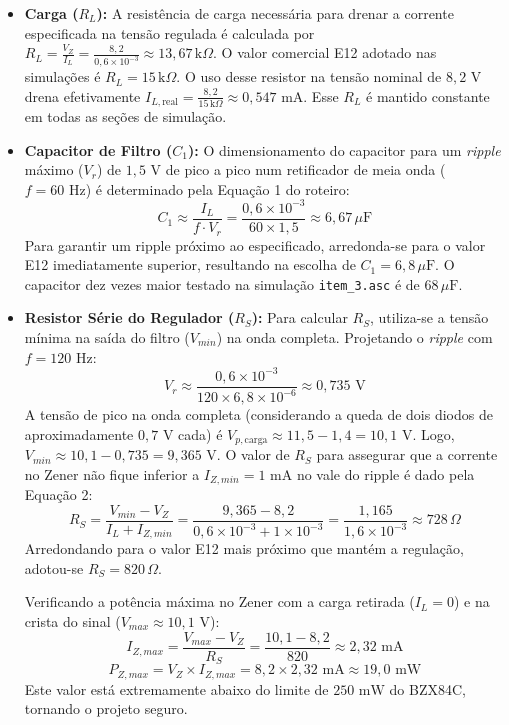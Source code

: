 \documentclass[11pt,a4paper]{article}
\begin{document}
\begin{itemize}

    \item \textbf{Carga ($R_L$):} 
    A resistência de carga necessária para drenar a corrente especificada na tensão regulada é calculada por $R_L = \frac{V_Z}{I_L} = \frac{8{,}2}{0{,}6 \times 10^{-3}} \approx 13{,}67\,\mathrm{k}\Omega$. O valor comercial E12 adotado nas simulações é $R_L = 15\,\mathrm{k}\Omega$. O uso desse resistor na tensão nominal de $8{,}2\text{ V}$ drena efetivamente $I_{L,\text{real}} = \frac{8{,}2}{15\,\mathrm{k}\Omega} \approx 0{,}547\text{ mA}$. Esse $R_L$ é mantido constante em todas as seções de simulação.

    \item \textbf{Capacitor de Filtro ($C_1$):}
    O dimensionamento do capacitor para um \textit{ripple} máximo ($V_r$) de $1{,}5\text{ V}$ de pico a pico num retificador de meia onda ($f = 60\text{ Hz}$) é determinado pela Equação 1 do roteiro:
    \[
    C_1 \approx \frac{I_L}{f \cdot V_r} = \frac{0{,}6 \times 10^{-3}}{60 \times 1{,}5} \approx 6{,}67\,\mu\text{F}
    \]
    Para garantir um ripple próximo ao especificado, arredonda-se para o valor E12 imediatamente superior, resultando na escolha de $C_1 = 6{,}8\,\mu\text{F}$. O capacitor dez vezes maior testado na simulação \texttt{item\_3.asc} é de $68\,\mu\text{F}$.

    \item \textbf{Resistor Série do Regulador ($R_S$):}
    Para calcular $R_S$, utiliza-se a tensão mínima na saída do filtro ($V_{min}$) na onda completa. Projetando o \textit{ripple} com $f = 120\text{ Hz}$:
    \[
    V_r \approx \frac{0{,}6 \times 10^{-3}}{120 \times 6{,}8 \times 10^{-6}} \approx 0{,}735\text{ V}
    \]
    A tensão de pico na onda completa (considerando a queda de dois diodos de aproximadamente $0{,}7\text{ V}$ cada) é $V_{p,\text{carga}} \approx 11{,}5 - 1{,}4 = 10{,}1\text{ V}$. Logo, $V_{min} \approx 10{,}1 - 0{,}735 = 9{,}365\text{ V}$.
    O valor de $R_S$ para assegurar que a corrente no Zener não fique inferior a $I_{Z,min} = 1\text{ mA}$ no vale do ripple é dado pela Equação 2:
    \[
    R_S = \frac{V_{min} - V_Z}{I_L + I_{Z,min}} = \frac{9{,}365 - 8{,}2}{0{,}6 \times 10^{-3} + 1 \times 10^{-3}} = \frac{1{,}165}{1{,}6 \times 10^{-3}} \approx 728\,\Omega
    \]
    Arredondando para o valor E12 mais próximo que mantém a regulação, adotou-se $R_S = 820\,\Omega$. 
    
    Verificando a potência máxima no Zener com a carga retirada ($I_L = 0$) e na crista do sinal ($V_{max} \approx 10{,}1\text{ V}$):
    \[
    I_{Z,max} = \frac{V_{max} - V_Z}{R_S} = \frac{10{,}1 - 8{,}2}{820} \approx 2{,}32\text{ mA}
    \]
    \[
    P_{Z,max} = V_Z \times I_{Z,max} = 8{,}2 \times 2{,}32\text{ mA} \approx 19{,}0\text{ mW}
    \]
    Este valor está extremamente abaixo do limite de $250\text{ mW}$ do BZX84C, tornando o projeto seguro.

\end{itemize}
\end{document}
